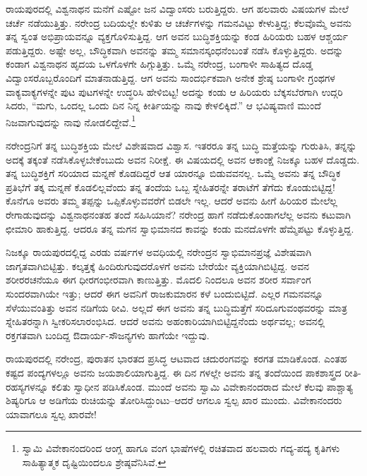 ರಾಯಪುರದಲ್ಲಿ ವಿಶ್ವನಾಥನ ಮನೆಗೆ ಎಷ್ಟೋ ಜನ ವಿದ್ವಾಂಸರು ಬರುತ್ತಿದ್ದರು. ಆಗ ಹಲವಾರು ವಿಷಯಗಳ ಮೇಲೆ ಚರ್ಚೆ ನಡೆಯುತ್ತಿತ್ತು. ನರೇಂದ್ರ ಬದಿಯಲ್ಲೇ ಕುಳಿತು ಆ ಚರ್ಚೆಗಳನ್ನು ಗಮನವಿಟ್ಟು ಕೇಳುತ್ತಿದ್ದ; ಕೆಲವೊಮ್ಮೆ ಅವನು ತನ್ನ ಸ್ವಂತ ಅಭಿಪ್ರಾಯವನ್ನೂ ವ್ಯಕ್ತಗೊಳಿಸುತ್ತಿದ್ದ. ಆಗ ಅವನ ಬುದ್ಧಿಶಕ್ತಿಯನ್ನು ಕಂಡ ಹಿರಿಯರು ಬಹಳ ಆಶ್ಚರ್ಯ ಪಡುತ್ತಿದ್ದರು. ಅಷ್ಟೇ ಅಲ್ಲ, ಬೌದ್ಧಿಕವಾಗಿ ಅವನನ್ನು ತಮ್ಮ ಸಮಾನಸ್ಕಂಧನೆಂಬಂತೆ ನಡೆಸಿ ಕೊಳ್ಳುತ್ತಿದ್ದರು. ಅದನ್ನು ಕಂಡಾಗ ವಿಶ್ವನಾಥನ ಹೃದಯ ಒಳಗೊಳಗೇ ಹಿಗ್ಗುತ್ತಿತ್ತು. ಒಮ್ಮೆ ನರೇಂದ್ರ, ಬಂಗಾಳೀ ಸಾಹಿತ್ಯದ ದೊಡ್ಡ ವಿದ್ವಾಂಸರೊಬ್ಬರೊಂದಿಗೆ ಮಾತನಾಡುತ್ತಿದ್ದ. ಆಗ ಅವನು ಸಾಂದರ್ಭಿಕವಾಗಿ ಅನೇಕ ಶ್ರೇಷ್ಠ ಬಂಗಾಳೀ ಗ್ರಂಥಗಳ ವಾಕ್ಯವಾಕ್ಯಗಳನ್ನೇ ಪುಟ ಪುಟಗಳನ್ನೇ ಉದ್ಧರಿಸಿ ಹೇಳಿಬಿಟ್ಟ! ಅದನ್ನು ಕಂಡು ಆ ಹಿರಿಯರು ಬೆಕ್ಕಸಬೆರಗಾಗಿ ಉದ್ಗರಿ ಸಿದರು, “ಮಗು, ಒಂದಲ್ಲ ಒಂದು ದಿನ ನಿನ್ನ ಕೀರ್ತಿಯನ್ನು ನಾವು ಕೇಳಲಿಕ್ಕಿದೆ.” ಆ ಭವಿಷ್ಯವಾಣಿ ಮುಂದೆ ನಿಜವಾಗುವುದನ್ನು ನಾವು ನೋಡಲಿದ್ದೇವೆ.\footnote{ಸ್ವಾಮಿ ವಿವೇಕಾನಂದರಿಂದ ಆಂಗ್ಲ ಹಾಗೂ ವಂಗ ಭಾಷೆಗಳಲ್ಲಿ ರಚಿತವಾದ ಹಲವಾರು ಗದ್ಯ-ಪದ್ಯ ಕೃತಿಗಳು ಸಾಹಿತ್ಯಾತ್ಮಕ ದೃಷ್ಟಿಯಿಂದಲೂ ಶ್ರೇಷ್ಠವೆನಿಸಿವೆ.}

ನರೇಂದ್ರನಿಗೆ ತನ್ನ ಬುದ್ಧಿಶಕ್ತಿಯ ಮೇಲೆ ವಿಶೇಷವಾದ ವಿಶ್ವಾಸ. ಇತರರೂ ತನ್ನ ಬುದ್ಧಿ ಮತ್ತೆಯನ್ನು ಗುರುತಿಸಿ, ತನ್ನನ್ನು ಅದಕ್ಕೆ ತಕ್ಕಂತೆ ನಡೆಸಿಕೊಳ್ಳಬೇಕೆಂಬುದು ಅವನ ನಿರೀಕ್ಷೆ. ಈ ವಿಷಯದಲ್ಲಿ ಅವನ ಆಕಾಂಕ್ಷೆ ನಿಜಕ್ಕೂ ಬಹಳ ದೊಡ್ಡದು. ತನ್ನ ಬುದ್ಧಿಶಕ್ತಿಗೆ ಸರಿಯಾದ ಮನ್ನಣೆ ಕೊಡದಿದ್ದರೆ ಆತ ಯಾರನ್ನೂ ಬಿಡುವವನಲ್ಲ. ಒಮ್ಮೆ ಅವನು ತನ್ನ ಬೌದ್ಧಿಕ ಪ್ರತಿಭೆಗೆ ತಕ್ಕ ಮನ್ನಣೆ ಕೊಡಲಿಲ್ಲವೆಂದು ತನ್ನ ತಂದೆಯ ಒಬ್ಬ ಸ್ನೇಹಿತರನ್ನೇ ತರಾಟೆಗೆ ತೆಗೆದು ಕೊಂಡುಬಿಟ್ಟಿದ್ದ! ಕೊನೆಗೂ ಅವರು ತಮ್ಮ ತಪ್ಪನ್ನು ಒಪ್ಪಿಕೊಳ್ಳುವವರೆಗೆ ಬಿಡಲೇ ಇಲ್ಲ. ಆದರೆ ಅವನು ಹೀಗೆ ಹಿರಿಯರ ಮೇಲೆಲ್ಲ ರೇಗಾಡುವುದನ್ನು ವಿಶ್ವನಾಥನಂತಹ ತಂದೆ ಸಹಿಸಿಯಾನೆ? ನರೇಂದ್ರ ಹಾಗೆ ನಡೆದುಕೊಂಡಾಗಲೆಲ್ಲ ಅವನು ಕಟುವಾಗಿ ಛೀಮಾರಿ ಹಾಕುತ್ತಿದ್ದ. ಆದರೂ ತನ್ನ ಮಗನ ಸ್ವಾಭಿಮಾನದ ಕಾವನ್ನು ಕಂಡು ಮನದೊಳಗೇ ಹೆಮ್ಮೆಪಟ್ಟು ಕೊಳ್ಳುತ್ತಿದ್ದ.

ನಿಜಕ್ಕೂ ರಾಯಪುರದಲ್ಲಿದ್ದ ಎರಡು ವರ್ಷಗಳ ಅವಧಿಯಲ್ಲಿ ನರೇಂದ್ರನ ಸ್ವಾಭಿಮಾನಪ್ರಜ್ಞೆ ವಿಶೇಷವಾಗಿ ಜಾಗೃತವಾಗಿಬಿಟ್ಟಿತ್ತು. ಕಲ್ಕತ್ತಕ್ಕೆ ಹಿಂದಿರುಗುವುದರೊಳಗೆ ಅವನು ಬೇರೆಯೇ ವ್ಯಕ್ತಿಯಾಗಿಬಿಟ್ಟಿದ್ದ. ಅವನ ಶರೀರರಚನೆಯೂ ಈಗ ಧೀರಗಂಭೀರವಾಗಿ ಕಾಣುತ್ತಿತ್ತು. ಮೊದಲಿ ನಿಂದಲೂ ಅವನ ಶರೀರ ಸರ್ವಾಂಗ ಸುಂದರವಾಗಿಯೇ ಇತ್ತು; ಆದರೆ ಈಗ ಅವನಿಗೆ ರಾಜಕುಮಾರನ ಕಳೆ ಬಂದುಬಿಟ್ಟಿದೆ. ಎಲ್ಲರ ಗಮನವನ್ನೂ ಸೆಳೆಯುವಂತಿತ್ತು ಅವನ ನಡಿಗೆಯ ಠೀವಿ. ಅಲ್ಲದೆ ಈಗ ಅವನು ತನ್ನ ಬುದ್ಧಿಮತ್ತೆಗೆ ಸರಿದೂಗುವಂಥವರನ್ನು ಮಾತ್ರ ಸ್ನೇಹಿತರನ್ನಾಗಿ ಸ್ವೀಕರಿಸಲಾರಂಭಿಸಿದ. ಆದರೆ ಅವನು ಅಹಂಕಾರಿಯಾಗಿಬಿಟ್ಟಿದ್ದನೆಂದು ಅರ್ಥವಲ್ಲ; ಅವನಲ್ಲಿ ರಕ್ತಗತವಾಗಿ ಬಂದಿದ್ದ ಔದಾರ್ಯ-ಸೌಜನ್ಯಗಳು ಹಾಗೆಯೇ ಇದ್ದುವು.

ರಾಯಪುರದಲ್ಲಿ ನರೇಂದ್ರ, ಪುರಾತನ ಭಾರತದ ಪ್ರಸಿದ್ಧ ಆಟವಾದ ಚದುರಂಗವನ್ನು ಕರಗತ ಮಾಡಿಕೊಂಡ. ಎಂತಹ ಕಷ್ಟದ ಪಂದ್ಯಗಳಲ್ಲೂ ಅವನು ಜಯಶಾಲಿಯಾಗುತ್ತಿದ್ದ. ಈ ದಿನ ಗಳಲ್ಲೇ ಅವನು ತನ್ನ ತಂದೆಯಿಂದ ಪಾಕಶಾಸ್ತ್ರದ ರೀತಿ-ರಹಸ್ಯಗಳನ್ನೂ ಕಲಿತು ಸ್ವಾಧೀನ ಪಡಿಸಿಕೊಂಡ. ಮುಂದೆ ಅವನು ಸ್ವಾಮಿ ವಿವೇಕಾನಂದರಾದ ಮೇಲೆ ಕೆಲವು ಪಾಶ್ಚಾತ್ಯ ಶಿಷ್ಯರಿಗೂ ಆ ಅಡಿಗೆಯ ರುಚಿಯನ್ನು ತೋರಿಸಿದ್ದುಂಟು–ಆದರೆ ಆಗಲೂ ಸ್ವಲ್ಪ ಖಾರ ಮುಂದು. ವಿವೇಕಾನಂದರು ಯಾವಾಗಲೂ ಸ್ವಲ್ಪ ಖಾರವೇ!

